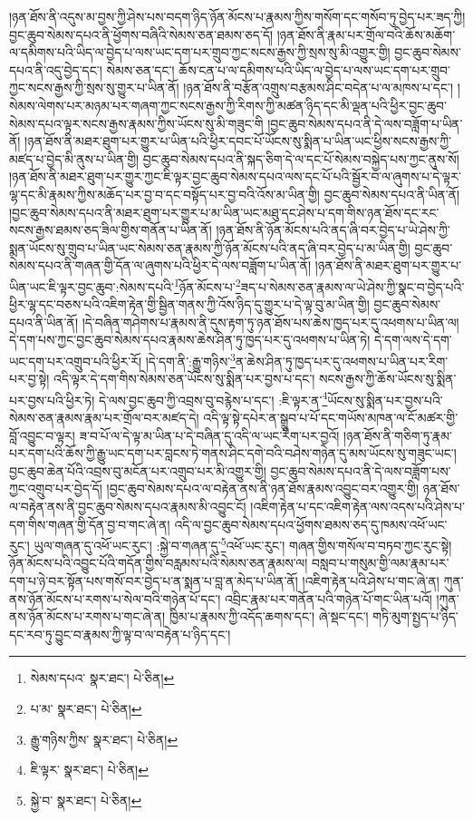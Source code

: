 །ཉན་ཐོས་ནི་འདུས་མ་བྱས་ཀྱི་ཤེས་པས་བདག་ཉིད་ཉོན་མོངས་པ་རྣམས་ཀྱིས་གསོག་དང་གསོབ་ཏུ་བྱེད་པར་ཟད་ཀྱི། བྱང་ཆུབ་སེམས་དཔའ་ནི་ཕྱོགས་བཞིའི་སེམས་ཅན་ཐམས་ཅད་དོ། །ཉན་ཐོས་ནི་རྣམ་པར་གྲོལ་བའི་ཆོས་མཆོག་ལ་དམིགས་པའི་ཡིད་ལ་བྱེད་པ་ལས་ཡང་དག་པར་གྲུབ་ཀྱང་སངས་རྒྱས་ཀྱི་སྲས་སུ་མི་འགྱུར་གྱི། བྱང་ཆུབ་སེམས་དཔའ་ནི་འདུ་བྱེད་དང་། སེམས་ཅན་དང་། ཆོས་ངན་པ་ལ་དམིགས་པའི་ཡིད་ལ་བྱེད་པ་ལས་ཡང་དག་པར་གྲུབ་ཀྱང་སངས་རྒྱས་ཀྱི་སྲས་སུ་གྱུར་པ་ཡིན་ནོ། །ཉན་ཐོས་ནི་བརྩོན་འགྲུས་བརྩམས་ཤིང་བདེན་པ་ལ་མཁས་པ་དང་། །སེམས་ལེགས་པར་མཉམ་པར་གཞག་ཀྱང་སངས་རྒྱས་ཀྱི་རིགས་ཀྱི་མཚན་ཉིད་དང་མི་ལྡན་པའི་ཕྱིར་བྱང་ཆུབ་སེམས་དཔའ་ལྟར་སངས་རྒྱས་རྣམས་ཀྱིས་ཡོངས་སུ་མི་གཟུང་གི །བྱང་ཆུབ་སེམས་དཔའ་ནི་དེ་ལས་བཟློག་པ་ཡིན་ནོ། །ཉན་ཐོས་ནི་མཐར་ཐུག་པར་གྱུར་པ་ཡིན་པའི་ཕྱིར་དབང་པོ་ཡོངས་སུ་སྨིན་པ་ཡིན་ཡང་ཕྱིས་སངས་རྒྱས་ཀྱི་མཛད་པ་བྱེད་མི་ནུས་པ་ཡིན་གྱི། བྱང་ཆུབ་སེམས་དཔའ་ནི་སྐད་ཅིག་དེ་ལ་དང་པོ་སེམས་བསྐྱེད་པས་ཀྱང་ནུས་སོ། །ཉན་ཐོས་ནི་མཐར་ཐུག་པར་གྱུར་ཀྱང་ཇི་ལྟར་བྱང་ཆུབ་སེམས་དཔའ་ལས་དང་པོ་པའི་སྦྱོར་བ་ལ་ཞུགས་པ་དེ་ལྟར་ལྷ་དང་མི་རྣམས་ཀྱིས་མཆོད་པར་བྱ་བ་དང་བསྟོད་པར་བྱ་བའི་འོས་མ་ཡིན་གྱི། བྱང་ཆུབ་སེམས་དཔའ་ནི་ཡིན་ནོ། །བྱང་ཆུབ་སེམས་དཔའ་ནི་མཐར་ཐུག་པར་གྱུར་པ་མ་ཡིན་ཡང་མཐུ་དང་ཤེས་པ་དག་གིས་ཉན་ཐོས་དང་རང་སངས་རྒྱས་ཐམས་ཅད་ཟིལ་གྱིས་གནོན་པ་ཡིན་ནོ། །ཉན་ཐོས་ནི་ཉོན་མོངས་པའི་ནད་ཞི་བར་བྱེད་པ་ཡེ་ཤེས་ཀྱི་སྨན་ཡོངས་སུ་གྲུབ་པ་ཡིན་ཡང་སེམས་ཅན་རྣམས་ཀྱི་ཉོན་མོངས་པའི་ནད་ཞི་བར་བྱེད་པ་མ་ཡིན་གྱི། བྱང་ཆུབ་སེམས་དཔའ་ནི་གཞན་གྱི་དོན་ལ་ཞུགས་པའི་ཕྱིར་དེ་ལས་བཟློག་པ་ཡིན་ནོ། །ཉན་ཐོས་ནི་མཐར་ཐུག་པར་གྱུར་པ་ཡིན་ཡང་ཇི་ལྟར་བྱང་ཆུབ་:སེམས་དཔའི་\footnote{སེམས་དཔའ་  སྣར་ཐང་།  པེ་ཅིན། }ཉོན་མོངས་པ་\footnote{པ་མ་  སྣར་ཐང་།  པེ་ཅིན། }ཟད་པ་སེམས་ཅན་རྣམས་ལ་ཡེ་ཤེས་ཀྱི་སྣང་བ་བྱེད་པའི་ཕྱིར་ལྷ་དང་བཅས་པའི་འཇིག་རྟེན་གྱི་སྦྱིན་གནས་ཀྱི་འོས་ཉིད་དུ་གྱུར་པ་དེ་ལྟ་བུ་མ་ཡིན་གྱི། བྱང་ཆུབ་སེམས་དཔའ་ནི་ཡིན་ནོ། །དེ་བཞིན་གཤེགས་པ་རྣམས་ནི་དུས་རྟག་ཏུ་ཉན་ཐོས་པས་ཆེས་ཁྱད་པར་དུ་འཕགས་པ་ཡིན་ལ། དེ་དག་པས་ཀྱང་བྱང་ཆུབ་སེམས་དཔའ་རྣམས་ཆེས་ཤིན་ཏུ་ཁྱད་པར་དུ་འཕགས་པ་ཡིན་ཏེ། དེ་དག་ལས་དེ་དག་ཡང་དག་པར་འགྲུབ་པའི་ཕྱིར་རོ། །དེ་དག་ནི་:རྒྱུ་གཉིས་\footnote{རྒྱུ་གཉིས་ཀྱིས་  སྣར་ཐང་།  པེ་ཅིན། }ན་ཆེས་ཤིན་ཏུ་ཁྱད་པར་དུ་འཕགས་པ་ཡིན་པར་རིག་པར་བྱ་སྟེ། འདི་ལྟར་དེ་དག་གིས་སེམས་ཅན་ཡོངས་སུ་སྨིན་པར་བྱས་པ་དང་། སངས་རྒྱས་ཀྱི་ཆོས་ཡོངས་སུ་སྨིན་པར་བྱས་པའི་ཕྱིར་ཏེ། དེ་ལས་བྱང་ཆུབ་ཀྱི་འབྲས་བུ་བརྙེས་པ་དང་། :ཇི་ལྟར་ན་\footnote{ཇི་ལྟར་  སྣར་ཐང་།  པེ་ཅིན། }ཡོངས་སུ་སྨིན་པར་བྱས་པའི་སེམས་ཅན་རྣམས་རྣམ་པར་གྲོལ་བར་མཛད་དེ། འདི་ལྟ་སྟེ་དཔེར་ན་སྒྲུབ་པ་པོ་དང་གཡོས་མཁན་ལ་ངོ་མཚར་གྱི་བློ་འབྱུང་བ་ལྟར། ཟ་བ་པོ་ལ་དེ་ལྟ་མ་ཡིན་པ་དེ་བཞིན་དུ་འདི་ལ་ཡང་རིག་པར་བྱའོ། །ཉན་ཐོས་ནི་གཅིག་ཏུ་རྣམ་པར་དག་པའི་ཆོས་ཀྱི་རྒྱུ་ཡང་དག་པར་བླངས་ཏེ་གནས་ཤིང་དགེ་བའི་བཤེས་གཉེན་དུ་མས་ཡོངས་སུ་གཟུང་ཡང་། བྱང་ཆུབ་ཆེན་པོའི་འབྲས་བུ་མངོན་པར་འགྲུབ་པར་མི་འགྱུར་གྱི། བྱང་ཆུབ་སེམས་དཔའ་ནི་དེ་ལས་བཟློག་པས་ཀྱང་འགྲུབ་པར་བྱེད་དོ། །བྱང་ཆུབ་སེམས་དཔའ་ལ་བརྟེན་ནས་ནི་ཉན་ཐོས་རྣམས་འབྱུང་བར་འགྱུར་གྱི། ཉན་ཐོས་ལ་བརྟེན་ནས་ནི་བྱང་ཆུབ་སེམས་དཔའ་རྣམས་མི་འབྱུང་ངོ། །འཇིག་རྟེན་པ་དང་འཇིག་རྟེན་ལས་འདས་པའི་ཤེས་པ་དག་གིས་གཞན་གྱི་དོན་བྱ་བ་གང་ཞེ་ན། འདི་ལ་བྱང་ཆུབ་སེམས་དཔའ་ཕྱོགས་ཐམས་ཅད་དུ་ཁམས་འཕོ་ཡང་རུང་། ཡུལ་གཞན་དུ་འཕོ་ཡང་རུང་། :སྐྱེ་བ་གཞན་དུ་\footnote{སྐྱེ་བ་  སྣར་ཐང་།  པེ་ཅིན། }འཕོ་ཡང་རུང་། གཞན་གྱིས་གསོལ་བ་བཏབ་ཀྱང་རུང་སྟེ། ཉོན་མོངས་པའི་འབྱུང་པོའི་གདོན་གྱིས་བརླམས་པའི་སེམས་ཅན་རྣམས་ལ། བསླབ་པ་གསུམ་གྱི་ལམ་རྣམ་པར་དག་པ་ཉེ་བར་སྟོན་པས་གསོ་བར་བྱེད་པ་ན་སྨན་པ་བླ་ན་མེད་པ་ཡིན་ནོ། །འཇིག་རྟེན་པའི་ཤེས་པ་གང་ཞེ་ན། ཀུན་ནས་ཉོན་མོངས་པ་རགས་པ་སེལ་བའི་གཉེན་པོ་དང་། འབྲིང་རྣམ་པར་གནོན་པའི་གཉེན་པོ་གང་ཡིན་པའོ། །ཀུན་ནས་ཉོན་མོངས་པ་རགས་པ་གང་ཞེ་ན། ཁྱིམ་པ་རྣམས་ཀྱི་འདོད་ཆགས་དང་། ཞེ་སྡང་དང་། གཏི་མུག་སྤྱད་པ་ཉིད་དང་རབ་ཏུ་བྱུང་བ་རྣམས་ཀྱི་ལྟ་བ་ལ་བརྟེན་པ་ཉིད་དང་། 